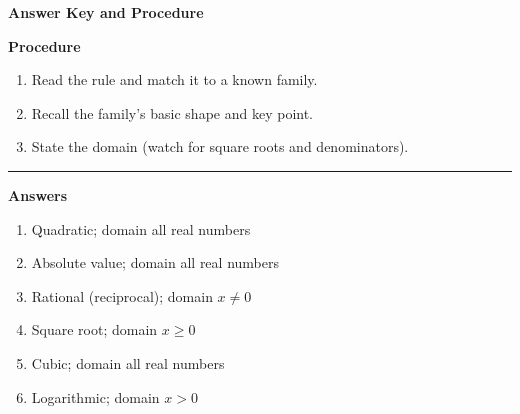 \documentclass[12pt]{article}
\begin{document}
\begin{center}{\Large \textbf{Answer Key and Procedure}}\end{center}
\vspace{0.3cm}
\textbf{Procedure}
\begin{enumerate}
  \item Read the rule and match it to a known family.
  \item Recall the family’s basic shape and key point.
  \item State the domain (watch for square roots and denominators).
\end{enumerate}
\vspace{0.4cm}\hrule\vspace{0.4cm}
\textbf{Answers}
\begin{enumerate}[label=\textbf{\arabic*.}]
  \item Quadratic; domain all real numbers
  \item Absolute value; domain all real numbers
  \item Rational (reciprocal); domain $x\neq 0$
  \item Square root; domain $x\ge 0$
  \item Cubic; domain all real numbers
  \item Logarithmic; domain $x>0$
\end{enumerate}
\end{document}
